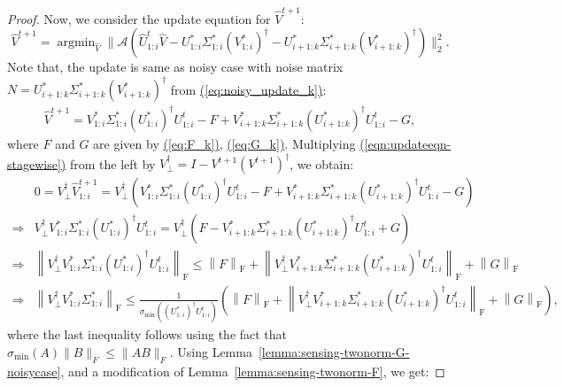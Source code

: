 \documentclass[11pt]{article}
\renewcommand{\eqref}[1]{\hyperref[#1]{(\ref*{#1})}}
\theoremstyle{plain}
\theoremstyle{definition}
\newcommand{\frob}[1]{\left\| {#1} \right\|_\text{F}}
\newcommand{\twonorm}[1]{\left\| {#1} \right\|_2}
\DeclareMathOperator*{\argmin}{argmin}
\newcommand{\aff}{{\mathcal A}}
\newcommand{\Vt}{V^{t+1}}
\newcommand{\Vht}{\widehat{V}^{t+1}}
\newcommand{\Ut}{U^{t}}
\newcommand{\Vo}{V^*}
\newcommand{\So}{\Sigma^*}
\newcommand{\Uo}{U^*}
\newcommand{\Vw}{\widehat{V}}
\newcommand{\Uw}{\widehat{U}}
\begin{document}
\begin{proof}
Now, we consider the update equation for $\Vht$:
$$\Vht=\argmin_{\Vw}\|\aff(\Uw^t_{1:i}\Vw-\Uo_{1:i}\So_{1:i}(\Vo_{1:i})^\dag-\Uo_{i+1:k}\So_{i+1:k}(\Vo_{i+1:k})^\dag)\|_2^2.$$
Note that, the update is same as noisy case with noise matrix $N=\Uo_{i+1:k}\So_{i+1:k}(\Vo_{i+1:k})^\dag$ from \eqref{eq:noisy_update_k}:
\begin{align}\label{eqn:updateeqn-stagewise}
  \Vht = \Vo_{1:i}\So_{1:i}(\Uo_{1:i})^\dag\Ut_{1:i}-F+ \Vo_{i+1:k}\So_{i+1:k}(\Uo_{i+1:k})^\dag\Ut_{1:i} - G,
\end{align}
where $F$ and $G$ are given by \eqref{eq:F_k}, \eqref{eq:G_k}. %
Multiplying \eqref{eqn:updateeqn-stagewise}
from the left by $V_{\perp}^{\dag}=I-\Vt(\Vt)^\dag$, we obtain:
\begin{align}
  &0 = V_{\perp}^{\dag}\Vht_{1:i} = V_{\perp}^{\dag} \left(\Vo_{1:i}\So_{1:i}(\Uo_{1:i})^\dag\Ut_{1:i} - F + \Vo_{i+1:k}\So_{i+1:k}(\Uo_{i+1:k})^\dag\Ut_{1:i} - G\right) \nonumber\\
\Rightarrow &V_{\perp}^{\dag} \Vo_{1:i}\So_{1:i}(\Uo_{1:i})^\dag\Ut_{1:i} = V_{\perp}^{\dag} \left( F - \Vo_{i+1:k}\So_{i+1:k}(\Uo_{i+1:k})^\dag\Ut_{1:i} + G\right) \nonumber\\
\Rightarrow &\frob{V_{\perp}^{\dag} \Vo_{1:i}\So_{1:i}(\Uo_{1:i})^\dag\Ut_{1:i}} \leq \frob{F} + \frob{V_{\perp}^{\dag}\Vo_{i+1:k}\So_{i+1:k}(\Uo_{i+1:k})^\dag\Ut_{1:i}} + \frob{G} \nonumber\\
\Rightarrow &\frob{V_{\perp}^{\dag} \Vo_{1:i}\So_{1:i}} \leq \frac{1}{\sigma_{\textrm{min}}\left((\Uo_{1:i})^\dag\Ut_{1:i}\right)} \left(\frob{F} + \frob{V_{\perp}^{\dag}\Vo_{i+1:k}\So_{i+1:k}(\Uo_{i+1:k})^\dag\Ut_{1:i}} + \frob{G}\right), \label{eqn:weighted-dist-decay1}
\end{align}
where the last inequality follows using the fact that $\sigma_{\min}(A)\|B\|_F\leq \|AB\|_F$. Using Lemma~\ref{lemma:sensing-twonorm-G-noisycase}, and a modification of Lemma~\ref{lemma:sensing-twonorm-F}, we get:

\end{proof}
\end{document}

